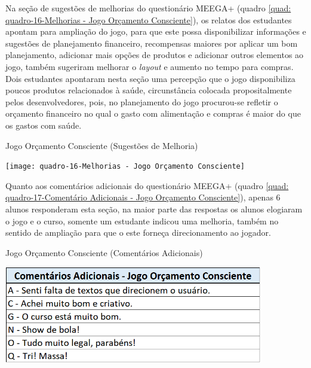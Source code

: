 Na seção de sugestões de melhorias do questionário MEEGA+ (quadro \ref{quad: quadro-16-Melhorias - Jogo Orçamento Consciente}), os relatos dos estudantes apontam para ampliação do jogo, para que este possa disponibilizar informações e sugestões de planejamento financeiro, recompensas maiores por aplicar um bom planejamento, adicionar mais opções de produtos e adicionar outros elementos ao jogo, também sugeriram melhorar o \textit{layout} e aumento no tempo para compras. Dois estudantes apontaram nesta seção uma percepção que o jogo disponibiliza poucos produtos relacionados à saúde, circunstância colocada propositalmente pelos desenvolvedores, pois, no planejamento do jogo procurou-se refletir o orçamento financeiro no qual o gasto com alimentação e compras é maior do que os gastos com saúde.

\graphicspath{{quadros/}} 
\begin{quadro}[!ht]
\centering
\begin{minipage}{0.8\textwidth}
\caption{Jogo Orçamento Consciente (Sugestões de Melhoria)}
\centering
\texttt{[image: quadro-16-Melhorias - Jogo Orçamento Consciente]}
\label{quad: quadro-16-Melhorias - Jogo Orçamento Consciente}
\end{minipage}
\end{quadro}

Quanto aos comentários adicionais do questionário MEEGA+ (quadro \ref{quad: quadro-17-Comentário Adicionais - Jogo Orçamento Consciente}), apenas 6 alunos responderam esta seção, na maior parte das respostas os alunos elogiaram o jogo e o curso, somente um estudante indicou uma melhoria, também no sentido de ampliação para que o este forneça direcionamento ao jogador.

\graphicspath{{quadros/}} 
\begin{quadro}[!ht]
\centering
\begin{minipage}{0.8\textwidth}
\caption{Jogo Orçamento Consciente (Comentários Adicionais)}
\centering
\includegraphics[width=0.85\textwidth]{quadro-17-Comentário Adicionais - Jogo Orçamento Consciente}
\label{quad: quadro-17-Comentário Adicionais - Jogo Orçamento Consciente}
\end{minipage}
\end{quadro}

